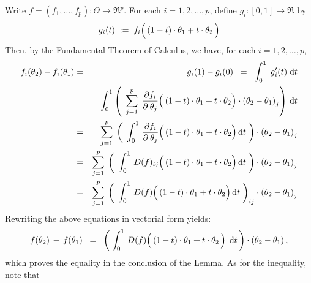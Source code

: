 \proof
Write $f = (f_{1}, \ldots , f_{p}) : \Theta \longrightarrow \Re^{p}$.
For each $i = 1, 2, \ldots, p$, define $g_{i} : [0,1] \longrightarrow \Re$ by
\begin{equation*}
g_{i}(t) \; := \; f_{i}\!\left(\,(1-t)\cdot \theta_{1} \overset{{\color{white}.}}{+} t \cdot \theta_{2}\,\right)
\end{equation*}
Then, by the Fundamental Theorem of Calculus, we have, for each $i = 1, 2, \ldots, p$,
\begin{eqnarray*}
f_{i}(\theta_{2}) - f_{i}(\theta_{1})
& = &
	g_{i}(1) - g_{i}(0)
\;\; = \;\;
	\int_{0}^{1}\; g_{i}^{\prime}(t) \;\d t
\\
& = &
	\int_{0}^{1} \left(\;\,
		\overset{p}{\underset{j=1}{\sum}}\;\,
		\dfrac{\partial f_{i}}{\partial_{{\color{white}.}}\theta_{j}}
		\!\left(\,(1-t)\cdot \theta_{1} \overset{{\color{white}.}}{+} t \cdot \theta_{2}\right)
		\cdot
		\left(\theta_{2} - \theta_{1}\right)_{j}
		\right)\,\d t
\\
& = &
	\overset{p}{\underset{j=1}{\sum}}\;
	\left(\;\,
		\int_{0}^{1}\,
			\dfrac{\partial f_{i}}{\partial_{{\color{white}.}}\theta_{j}}
			\!\left(\,(1-t)\cdot \theta_{1} \overset{{\color{white}.}}{+} t \cdot \theta_{2}\right)
			\d t \;
		\right)
	\cdot
	\left(\theta_{2} - \theta_{1}\right)_{j}
\\
& = &
	\overset{p}{\underset{j=1}{\sum}}\;
	\left(\;\,
		\int_{0}^{1}\,
			D(f)_{ij}
			\!\left(\,(1-t)\cdot \theta_{1} \overset{{\color{white}.}}{+} t \cdot \theta_{2}\right)
			\d t \;
		\right)
	\cdot
	\left(\theta_{2} - \theta_{1}\right)_{j}
\\
& = &
	\overset{p}{\underset{j=1}{\sum}}\;
	\left(\;\,
		\int_{0}^{1}\,
			D(f)
			\!\left(\,(1-t)\cdot \theta_{1} \overset{{\color{white}.}}{+} t \cdot \theta_{2}\right)
			\d t \;
		\right)_{ij}
	\cdot
	\left(\theta_{2} - \theta_{1}\right)_{j}
\end{eqnarray*}
Rewriting the above equations in vectorial form yields:
\begin{equation*}
f(\theta_{2}) \, - \, f(\theta_{1})
\;\; = \;\;
	\left(\;\int_{0}^{1}\, D(f)\!\left(\,(1-t)\cdot \theta_{1} \overset{{\color{white}.}}{+} t \cdot \theta_{2} \,\right) \;\d t\,\right)
	\cdot (\theta_{2} - \theta_{1})\,,
\end{equation*}
which proves the equality in the conclusion of the Lemma.
As for the inequality, note that
